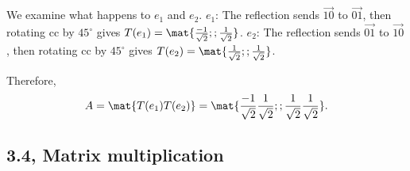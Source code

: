 \begin{problems}
\begin{solution}
  We examine what happens to $e_1$ and $e_2$.
 \newline
 $e_1$:  The reflection sends $\vec{1 0}$ to $\vec{0 1}$, then rotating cc by $45^\circ$ gives
 $T(e_1) = \mat{\frac{-1}{\sqrt{2}} ; ; \frac{1}{\sqrt{2}} }$.
\newline \newline \newline
$e_2$: The reflection sends $\vec{0 1}$ to $\vec{1 0}$, then rotating cc by $45^\circ$ gives
$T(e_2) = \mat{\frac{1}{\sqrt{2}} ; ; \frac{1}{\sqrt{2}} }$.

Therefore,
\[A = \mat{T(e_1) T(e_2)} = \mat{ \frac{-1}{\sqrt{2}} \frac{1}{\sqrt{2}}; ;
    \frac{1}{\sqrt{2}} \frac{1}{\sqrt{2}}}.\]
\end{solution}

\end{problems} \setcounter{problem}{0}

\newpage

\subsection{3.4, Matrix multiplication}

